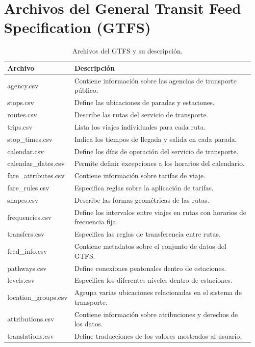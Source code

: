 \section{Archivos del General Transit Feed Specification (GTFS)}
\label{ap:gtfs_files}

\begin{table}[H]
    \centering
    \begin{tabular}{|l|p{10cm}|}
        \hline
        \textbf{Archivo} & \textbf{Descripción} \\
        \hline
        agency.csv & Contiene información sobre las agencias de transporte público. \\
        stops.csv & Define las ubicaciones de paradas y estaciones. \\
        routes.csv & Describe las rutas del servicio de transporte. \\
        trips.csv & Lista los viajes individuales para cada ruta. \\
        stop_times.csv & Indica los tiempos de llegada y salida en cada parada. \\
        calendar.csv & Define los días de operación del servicio de transporte. \\
        calendar_dates.csv & Permite definir excepciones a los horarios del calendario. \\
        fare_attributes.csv & Contiene información sobre tarifas de viaje. \\
        fare_rules.csv & Especifica reglas sobre la aplicación de tarifas. \\
        shapes.csv & Describe las formas geométricas de las rutas. \\
        frequencies.csv & Define los intervalos entre viajes en rutas con horarios de frecuencia fija. \\
        transfers.csv & Especifica las reglas de transferencia entre rutas. \\
        feed_info.csv & Contiene metadatos sobre el conjunto de datos del GTFS. \\
        pathways.csv & Define conexiones peatonales dentro de estaciones. \\
        levels.csv & Especifica los diferentes niveles dentro de estaciones. \\
        location_groups.csv & Agrupa varias ubicaciones relacionadas en el sistema de transporte. \\
        attributions.csv & Contiene información sobre atribuciones y derechos de los datos. \\
        translations.csv & Define traducciones de los valores mostrados al usuario. \\
        \hline
    \end{tabular}
    \caption{Archivos del GTFS y su descripción.}
    \label{tab:gtfs_files_apendice}
\end{table}
